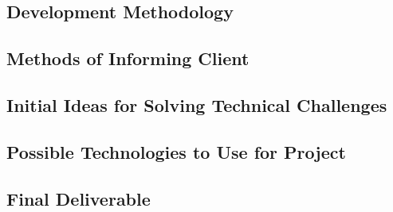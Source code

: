 \documentclass{article}
\begin{document}
	\subsection{Development Methodology}
		
	\subsection{Methods of Informing Client}
		
	\subsection{Initial Ideas for Solving Technical Challenges}
	\subsection{Possible Technologies to Use for Project}
	\subsection{Final Deliverable}
\end{document}

